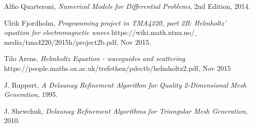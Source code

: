 \documentclass[10pt,a4paper]{article}
\begin{document}



\begin{thebibliography}{}

Alfio Quarteroni, \emph{Numerical Models for Differential Problems}, 2nd Edition, 2014.

Ulrik Fjordholm, \emph{Programming project in TMA4220, part 2B:
Helmholtz' equation for electromagnetic waves} https://wiki.math.ntnu.no/$\_$media/tma4220/2015h/project2b.pdf, Nov 2015.

Tilo Arens, \emph{Helmholtz Equation - waveguides and scattering} https://people.maths.ox.ac.uk/trefethen/pdectb/helmholtz2.pdf, Nov 2015

J. Ruppert, \emph{A Delaunay Refinement Algorithm for Quality 2-Dimensional Mesh Generation}, 1995.

J. Shewchuk, \emph{Delaunay Refinement Algorithms for Triangular Mesh Generation}, 2010.



\end{thebibliography}
\end{document}
